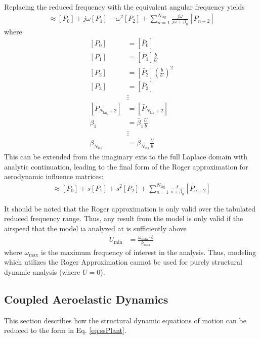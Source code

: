 Replacing the reduced frequency with the equivalent angular frequency yields
\begin{align}
	[A(j\omega)] \approx [P_0] + j\omega [P_1] - \omega^2 [P_2] + \sum_{n=1}^{N_\text{lag}} \frac{j\omega}{j\omega+\beta_n} [P_{n+2}]
\end{align}
where
\begin{equation}
\begin{aligned}
	[P_0] &= [\bar{P}_0] \\
	[P_1] &= [\bar{P}_1] \frac{b}{U} \\
	[P_2] &= [\bar{P}_2] \left(\frac{b}{U}\right)^2 \\
	[P_3] &= [\bar{P}_3] \\
	&\vdots \\
	[P_{N_\text{lag}+2}] &= 	[\bar{P}_{N_\text{lag}+2}] \\
	\beta_1 &= \bar{\beta}_1 \frac{U}{b} \\
	&\vdots \\
	\beta_{N_\text{lag}} &= \bar{\beta}_{N_\text{lag}} \frac{U}{b}
\end{aligned}
\end{equation}
This can be extended from the imaginary exis to the full Laplace domain with analytic continuation, leading to the final form of the Roger approximation for aerodynamic influence matrices:
\begin{align}
	[A(s)] \approx [P_0] + s [P_1] + s^2 [P_2] + \sum_{n=1}^{N_\text{lag}} \frac{s}{s+\beta_n} [P_{n+2}]
\end{align}

It should be noted that the Roger approximation is only valid over the tabulated reduced frequency range. Thus, any result from the model is only valid if the airspeed that the model ia analyzed at is sufficiently above
\begin{align}
	U_\text{min} &= \frac{\omega_\text{max} \cdot b}{k_\text{max}}
\end{align}
where $\omega_\text{max}$ is the maximum frequency of interest in the analysis. Thus, modeling which utilizes the Roger Approximation cannot be used for purely structural dynamic analysis (where $U=0$).

\subsection{Coupled Aeroelastic Dynamics}

This section describes how the structural dynamic equations of motion can be reduced to the form in Eq. \ref{eq:ssPlant}.

